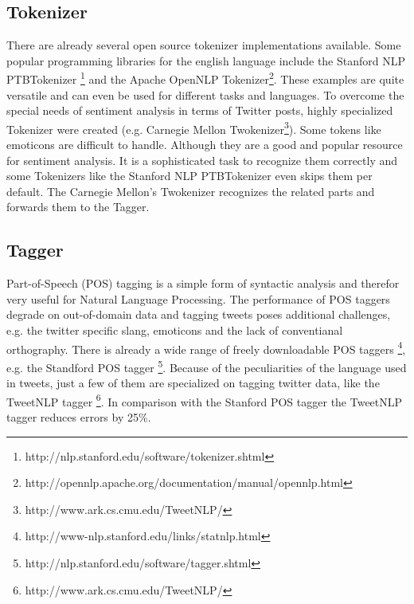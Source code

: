 \subsection{Tokenizer}
There are already several open source tokenizer implementations
available. Some popular programming libraries for the english 
language include the Stanford NLP PTBTokenizer
\footnote{http://nlp.stanford.edu/software/tokenizer.shtml} 
and the Apache OpenNLP Tokenizer\footnote{http://opennlp.apache.org/documentation/manual/opennlp.html}.
These examples are quite versatile and can even be
used for different tasks and languages.
To overcome the special needs of sentiment analysis in terms of Twitter posts,
highly specialized Tokenizer were created (e.g. Carnegie 
Mellon Twokenizer\footnote{http://www.ark.cs.cmu.edu/TweetNLP/}).
Some tokens like emoticons are difficult to handle. Although they 
are a good and popular resource for sentiment analysis. \autocite{emoticons}
It is a sophisticated task to recognize them correctly and some Tokenizers 
like the Stanford NLP PTBTokenizer even skips them per default. 
The Carnegie Mellon's Twokenizer recognizes the related parts and
forwards them to the Tagger.

\subsection{Tagger}
Part-of-Speech (POS) tagging is a simple form of syntactic analysis and therefor
very useful for Natural Language Processing. The performance of POS taggers degrade
on out-of-domain data and tagging tweets poses additional challenges, e.g. the twitter
specific slang, emoticons and the lack of conventianal orthography. \autocite{Gimpel2011}
There is already a wide range of freely downloadable POS taggers \footnote{http://www-nlp.stanford.edu/links/statnlp.html},
e.g. the Standford POS tagger \footnote{http://nlp.stanford.edu/software/tagger.shtml}.
Because of the peculiarities of the language used in tweets, just a few of them are
specialized on tagging twitter data, like the TweetNLP tagger \footnote{http://www.ark.cs.cmu.edu/TweetNLP/}.
In comparison with the Stanford POS tagger the TweetNLP tagger reduces errors by 25\%. \autocite{Saif2012}


